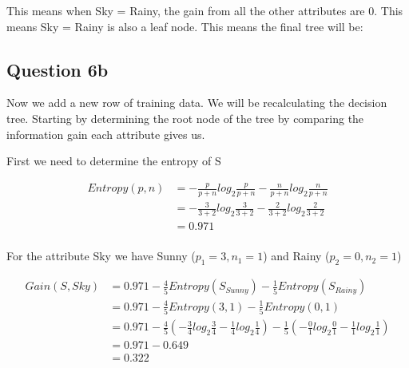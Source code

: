 \documentclass[10pt,a4paper]{article}
\begin{document}
{{{{{{{{{{This means when Sky = Rainy, the gain from all the other attributes are 0. This means Sky = Rainy is also a leaf node. This means the final tree will be:


\subsection{Question 6b}
Now we add a new row of training data. We will be recalculating the decision tree. Starting by determining the root node of the tree by comparing the information gain each attribute gives us.

First we need to determine the entropy of S

\begin{equation}
\begin{split}
Entropy(p,n) &=  -\frac{p}{p+n}log_2\frac{p}{p+n} - \frac{n}{p+n}log_2\frac{n}{p+n}  \\
           &= -\frac{3}{3+2} log_2\frac{3}{3+2} -\frac{2}{3+2} log_2\frac{2}{3+2} \\
           &= 0.971   \\
\end{split}
\end{equation}

For the attribute Sky we have Sunny ($p_1=3,n_1=1$) and Rainy ($p_2=0,n_2=1$)

\begin{equation}
\begin{split}
Gain(S,Sky) &= 0.971 -\frac{4}{5} Entropy(S_{Sunny} ) - \frac{1}{5}Entropy(S_{Rainy}) \\
          &= 0.971 - \frac{4}{5} Entropy(3,1) - \frac{1}{5}Entropy(0,1) \\
          &= 0.971 -\frac{4}{5} ( -\frac{3}{4} log_2\frac{3}{4} -\frac{1}{4} log_2\frac{1}{4} ) - \frac{1}{5}(-\frac{0}{1} log_2\frac{0}{1} - \frac{1}{1}log_2\frac{1}{1} ) \\
          &= 0.971 - 0.649\\
          &= 0.322 \\
\end{split}
\end{equation}

}}}}}}}}}}
\end{document}
